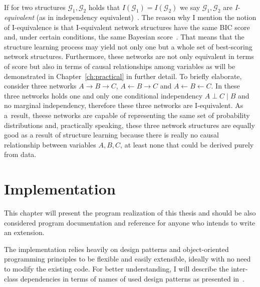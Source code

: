 \documentclass[english,cover]{fitthesis} %
\newcommand{\term}[1]{\emph{#1}}           %
\begin{document}
If for two structures $\mathcal{G}_1, \mathcal{G}_2$ holds that $I(\mathcal{G}_1) = I(\mathcal{G}_2)$ we say $\mathcal{G}_1, \mathcal{G}_2$ are \term{I-equivalent} (as in independency equivalent)~\cite[p.~76]{pgm}. The reason why I mention the notion of I-equivalence is that I-equivalent network structures have the same BIC score and, under certain conditions, the same Bayesian score~\cite[p.~807]{pgm}. That means that the structure learning process may yield not only one but a whole set of best-scoring network structures. Furthermore, these networks are not only equivalent in terms of score but also in terms of causal relationships among variables as will be demonstrated in Chapter~\ref{ch:practical} in further detail. To briefly elaborate, consider three networks $A \rightarrow B \rightarrow C$, $A \leftarrow B \rightarrow C$ and $A \leftarrow B \leftarrow C$. In these three networks holds one and only one conditional independency $A \perp C \mid B$ and no marginal independency, therefore these three networks are I-equivalent. As a~result, theese networks are capable of representing the same set of probability distributions and, practically speaking, these three network structures are equally good as a result of structure learning because there is really no causal relationship between variables $A,B,C$, at least none that could be derived purely from data.




























\chapter{Implementation}
This chapter will present the program realization of this thesis and should be also considered program documentation and reference for anyone who intends to write an extension.

The implementation relies heavily on design patterns and object-oriented programming principles to be flexible and easily extensible, ideally with no need to modify the existing code. For better understanding, I will describe the inter-class dependencies in terms of names of used design patterns as presented in~\cite{head_first_design_patterns}.
\end{document}
